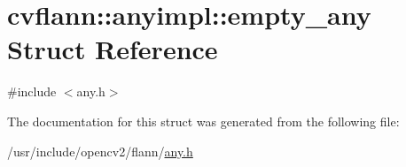 \hypertarget{structcvflann_1_1anyimpl_1_1empty__any}{\section{cvflann\-:\-:anyimpl\-:\-:empty\-\_\-any Struct Reference}
\label{structcvflann_1_1anyimpl_1_1empty__any}
}


{\ttfamily \#include $<$any.\-h$>$}



The documentation for this struct was generated from the following file\-:\begin{DoxyCompactItemize}
\item 
/usr/include/opencv2/flann/\hyperlink{any_8h}{any.\-h}\end{DoxyCompactItemize}
